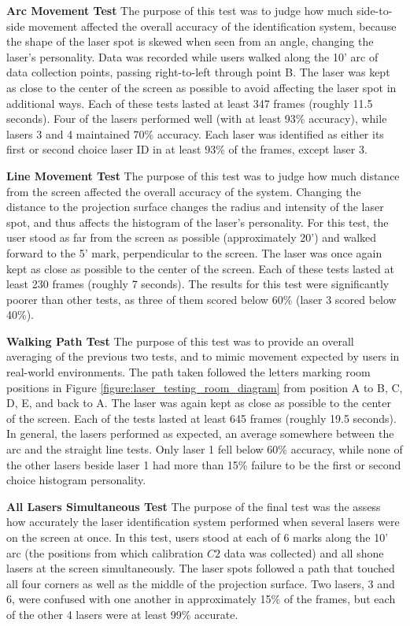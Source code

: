 \textbf{Arc Movement Test} The purpose of this test was to judge how
much side-to-side movement affected the overall accuracy of the
identification system, because the shape of the laser spot is skewed
when seen from an angle, changing the laser's personality. Data was
recorded while users walked along the 10' arc of data collection
points, passing right-to-left through point B. The laser was kept as
close to the center of the screen as possible to avoid affecting the
laser spot in additional ways. Each of these tests lasted at least 347
frames (roughly 11.5 seconds). Four of the lasers performed well (with
at least 93\% accuracy), while lasers 3 and 4 maintained 70\%
accuracy. Each laser was identified as either its first or second
choice laser ID in at least 93\% of the frames, except laser 3.

\textbf{Line Movement Test} The purpose of this test was to
judge how much distance from the screen affected the overall accuracy
of the system. Changing the distance to the projection surface changes
the radius and intensity of the laser spot, and thus affects the
histogram of the laser's personality. For this test, the user stood as
far from the screen as possible (approximately 20') and walked forward
to the 5' mark, perpendicular to the screen. The laser was once again
kept as close as possible to the center of the screen. Each of these
tests lasted at least 230 frames (roughly 7 seconds). The results for
this test were significantly poorer than other tests, as three of them
scored below 60\% (laser 3 scored below 40\%).

\textbf{Walking Path Test} The purpose of this test was to provide an
overall averaging of the previous two tests, and to mimic movement
expected by users in real-world environments. The path taken followed
the letters marking room positions in Figure
\ref{figure:laser_testing_room_diagram} from position A to B, C, D, E,
and back to A. The laser was again kept as close as possible to the
center of the screen. Each of the tests lasted at least 645 frames
(roughly 19.5 seconds). In general, the lasers performed as expected,
an average somewhere between the arc and the straight line tests. Only
laser 1 fell below 60\% accuracy, while none of the other lasers beside laser 1 had more
than 15\% failure to be the first or second choice histogram
personality.

\textbf{All Lasers Simultaneous Test} The purpose of the final test
was the assess how accurately the laser identification system
performed when several lasers were on the screen at once. In this
test, users stood at each of 6 marks along the 10' arc (the positions
from which calibration $C2$ data was collected) and all shone lasers
at the screen simultaneously. The laser spots followed a path that
touched all four corners as well as the middle of the projection
surface.  Two lasers, 3 and 6, were confused with one another in
approximately 15\% of the frames, but each of the other 4 lasers were
at least 99\% accurate.

